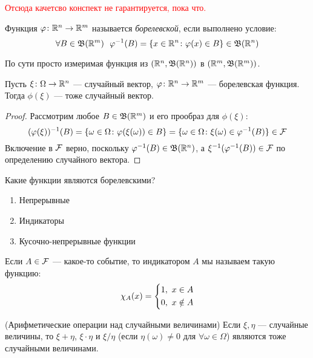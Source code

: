 \textcolor{red}{Отсюда качетсво конспект не гарантируется, пока что.}

\begin{definition}
	Функция $\varphi \colon \mathbb{R}^n \to \mathbb{R}^m$ называется \textit{борелевской}, если выполнено условие:
	\[
		\forall B \in \mathfrak{B}(\mathbb{R}^m)\ \ \varphi^{-1}(B) = \{x \in \mathbb{R}^n \colon \varphi(x) \in B\} \in \mathfrak{B}(\mathbb{R}^n)
	\]
\end{definition}

\begin{anote}
	По сути просто измеримая функция из $(\mathbb{R}^n, \mathfrak{B}(\mathbb{R}^n))$ в $(\mathbb{R}^m, \mathfrak{B}(\mathbb{R}^m))$.
\end{anote}

\begin{proposition}
	Пусть $\xi \colon \Omega \to \mathbb{R}^n$ --- случайный вектор, $\varphi \colon \mathbb{R}^n \to \mathbb{R}^m$ --- борелевская функция. Тогда $\phi(\xi)$ --- тоже случайный вектор.
\end{proposition}

\begin{proof}
	Рассмотрим любое $B \in \mathfrak{B}(\mathbb{R}^m)$ и его прообраз для $\phi(\xi)$:
	\[
		(\varphi(\xi))^{-1}(B) = \{\omega \in \Omega \colon \varphi(\xi(\omega)) \in B\} = \{\omega \in \Omega \colon \xi(\omega) \in \varphi^{-1}(B)\} \in \mathcal{F}
	\]
	Включение в $\mathcal{F}$ верно, поскольку $\varphi^{-1}(B) \in \mathfrak{B}(\mathbb{R}^n)$, а $\xi^{-1}(\varphi^{-1}(B)) \in \mathcal{F}$ по определению случайного вектора.
\end{proof}

\begin{note}
	Какие функции являются борелевскими?
	\begin{enumerate}
		\item Непрерывные
		
		\item Индикаторы
		
		\item Кусочно-непрерывные функции
	\end{enumerate}
\end{note}

\begin{reminder}
	Если $A \in \mathcal{F}$ --- какое-то событие, то индикатором $A$ мы называем такую функцию:
	\[
		\chi_A(x) = \left\{\begin{aligned}
			&{1,\ x \in A}
			\\
			&{0,\ x \notin A}
		\end{aligned}\right.
	\]
\end{reminder}

\begin{corollary} (Арифметические операции над случайными величинами)
	Если $\xi, \eta$ --- случайные величины, то $\xi + \eta$, $\xi \cdot \eta$ и $\xi / \eta$ (если $\eta(\omega) \neq 0$ для $\forall \omega \in \Omega$) являются тоже случайными величинами.
\end{corollary}

